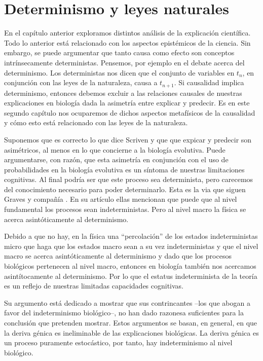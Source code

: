 
\chapter{Determinismo y leyes naturales}

\noindent En el capítulo anterior exploramos distintos análisis de la explicación científica. Todo lo anterior está relacionado con los aspectos epistémicos de la ciencia. Sin embargo, se puede argumentar que tanto causa como efecto son conceptos intrínsecamente deterministas. Pensemos, por ejemplo en el debate acerca del determinismo. Los deterministas nos dicen que el conjunto de variables en $t_{n}$, en conjunción con las leyes de la naturaleza, causa a $t_{n+1}$. Si causalidad implica determinismo, entonces debemos excluir a las relaciones causales de nuestras explicaciones en biología dada la asimetría entre explicar y predecir. Es en este segundo capítulo nos ocuparemos de dichos aspectos metafísicos de la causalidad y cómo esto está relacionado con las leyes de la naturaleza.

Suponemos que es correcto lo que dice Scriven y que que expicar y predecir son asimétricos, al menos en lo que concierne a la biología evolutiva. Puede argumentarse, con razón, que esta asimetría en conjunción con el uso de probabilidades en la biología evolutiva es un síntoma de nuestras limitaciones cognitivas. Al final podría ser que este proceso sea determinista, pero carecemos del conocimiento necesario para poder determinarlo. Esta es la via que siguen Graves y compañía \citeyear{Graves1999}. En su artículo ellas mencionan que puede que al nivel fundamental los procesos sean indeterministas. Pero al nivel macro la física se acerca asintóticamente al determinismo.

Debido a que no hay, en la física una ``percolación'' de los estados indeterministas micro que haga que los estados macro sean a su vez indeterministas y que el nivel macro se acerca asintóticamente al determinismo y dado que los procesos biológicos pertenecen al nivel macro, entonces en biología también nos acercamos asintítocamente al determinismo. Por lo que el estatus indeterminista de la teoría es un reflejo de nuestras limitadas capacidades cognitivas.

Su argumento está dedicado a mostrar que sus contrincantes --los que abogan a favor del indeterminismo biológico--, no han dado razonesa suficientes para la conclusión que pretenden mostrar. Estos argumentos se basan, en general, en que la deriva génica es ineliminable de las explicaciones biológicas. La deriva génica es un proceso puramente estocástico, por tanto, hay indeterminismo al nivel biológico.

